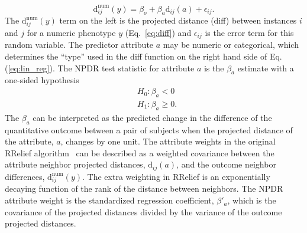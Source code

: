 \documentclass{bioinfo}
\begin{document}

%
%
\begin{equation}\label{eq:lin_reg}
    \text{d}^{\text{num}}_{ij}(y) = \beta_{o} + \beta_{a} \text{d}_{ij}(a) + \epsilon_{ij}.
\end{equation}
The $\text{d}^{\text{num}}_{ij}(y)$ term on the left is the projected distance (diff) between instances $i$ and $j$ for a numeric phenotype $y$ (Eq.~\ref{eq:diff}) and $\epsilon_{ij}$ is the error term for this random variable.
The predictor attribute $a$ may be numeric or categorical, which determines the ``type'' used in the diff function on the right hand side of Eq.(\ref{eq:lin_reg}).
The NPDR test statistic for attribute $a$ is the $\beta_a$ estimate with a one-sided hypothesis
\begin{equation}\label{eq:linreg_null}
\begin{aligned}
    & H_0: \beta_a < 0 \\
    & H_1: \beta_a \ge 0.
\end{aligned}
\end{equation}
The $\beta_a$ can be interpreted as the predicted change in the difference of the quantitative outcome between a pair of subjects when the projected distance of the attribute, $a$, changes by one unit.
The attribute weights in the original RRelief algorithm~\citep{robnik03} can be described as a weighted covariance between the attribute neighbor projected distances, $\text{d}_{ij}(a)$, and the outcome neighbor differences, $\text{d}^{\text{num}}_{ij}(y)$.
The extra weighting in RRelief is an exponentially decaying function of the rank of the distance between neighbors.
The NPDR attribute weight is the standardized regression coefficient, $\beta'_a$, which is the covariance of the projected distances divided by the variance of the outcome projected distances.
\end{document}
